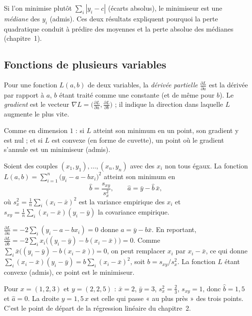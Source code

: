 \begin{remarque}
Si l'on minimise plutôt $\sum_i|y_i-c|$ (écarts absolus), le minimiseur est une \emph{médiane} des $y_i$ (admis).
Ces deux résultats expliquent pourquoi la perte quadratique conduit à prédire des moyennes et la perte absolue des médianes (chapitre~1).
\end{remarque}

\subsection{Fonctions de plusieurs variables}

\begin{definition}
Pour une fonction $L(a,b)$ de deux variables, la \emph{dérivée partielle} $\frac{\partial L}{\partial a}$ est la dérivée par rapport à $a$, $b$ étant traité comme une constante (et de même pour $b$).
Le \emph{gradient} est le vecteur $\nabla L=\big(\frac{\partial L}{\partial a},\frac{\partial L}{\partial b}\big)$ ; il indique la direction dans laquelle $L$ augmente le plus vite.
\end{definition}

Comme en dimension $1$ : si $L$ atteint son minimum en un point, son gradient y est nul ; et si $L$ est convexe (en forme de cuvette), un point où le gradient s'annule est un minimiseur (admis).

\begin{proposition}
\label{prop:droite}
Soient des couples $(x_1,y_1),\dots,(x_n,y_n)$ avec des $x_i$ non tous égaux. La fonction
$L(a,b)=\sum_{i=1}^n\big(y_i-a-bx_i\big)^2$ atteint son minimum en
\[
  \hat b=\frac{s_{xy}}{s_x^2},\qquad \hat a=\bar y-\hat b\,\bar x,
\]
où $s_x^2=\frac1n\sum_i(x_i-\bar x)^2$ est la variance empirique des $x_i$ et $s_{xy}=\frac1n\sum_i(x_i-\bar x)(y_i-\bar y)$ la covariance empirique.
\end{proposition}
\begin{preuve}
$\frac{\partial L}{\partial a}=-2\sum_i(y_i-a-bx_i)=0$ donne $a=\bar y-b\bar x$.
En reportant, $\frac{\partial L}{\partial b}=-2\sum_ix_i\big((y_i-\bar y)-b(x_i-\bar x)\big)=0$. Comme $\sum_i\bar x\big((y_i-\bar y)-b(x_i-\bar x)\big)=0$, on peut remplacer $x_i$ par $x_i-\bar x$, ce qui donne
$\sum_i(x_i-\bar x)(y_i-\bar y)=b\sum_i(x_i-\bar x)^2$, soit $b=s_{xy}/s_x^2$. La fonction $L$ étant convexe (admis), ce point est le minimiseur.
\end{preuve}

\begin{exemple}
Pour $x=(1,2,3)$ et $y=(2,2,5)$ : $\bar x=2$, $\bar y=3$, $s_x^2=\frac23$, $s_{xy}=1$, donc $\hat b=1{,}5$ et $\hat a=0$. La droite $y=1{,}5\,x$ est celle qui passe « au plus près » des trois points.
C'est le point de départ de la régression linéaire du chapitre~2.
\end{exemple}

